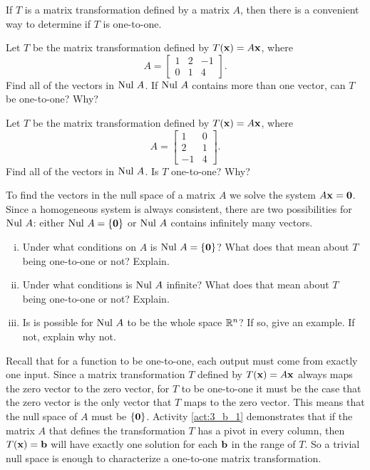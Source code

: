 \begin{activity} \label{act:3_b_1} 
If $T$ is a matrix transformation defined by a matrix $A$, then there is a convenient way to determine if $T$ is one-to-one.
\ba
\item Let $T$ be the matrix transformation defined by $T(\mathbf{x}) = A\mathbf{x}$, where 
\[A = \left[ \begin{array}{ccr} 1&2&-1 \\ 0&1&4 \end{array} \right].\]
Find all of the vectors in $\text{Nul } A$. If $\text{Nul } A$ contains more than one vector, can $T$ be one-to-one? Why?


\item Let $T$ be the matrix transformation defined by $T(\mathbf{x}) = A\mathbf{x}$, where 
\[A = \left[ \begin{array}{rc} 1&0 \\ 2&1 \\ -1&4 \end{array} \right].\]
Find all of the vectors in $\text{Nul } A$. Is $T$ one-to-one? Why?


\item To find the vectors in the null space of a matrix $A$ we solve the system $A \mathbf{x} = \mathbf{0}$. Since a homogeneous system is always consistent, there are two possibilities for $\text{Nul } A$: either $\text{Nul } A = \{\mathbf{0}\}$ or $\text{Nul } A$ contains infinitely many vectors. 
	\begin{enumerate}[i.]
	\item Under what conditions on $A$ is $\text{Nul } A = \{\mathbf{0}\}$? What does that mean about $T$ being one-to-one or not? Explain. 

	\item Under what conditions is $\text{Nul } A$ infinite? What does that mean about $T$ being one-to-one or not? Explain.

\item Is is possible for $\text{Nul } A$ to be the whole space $\mathbb{R}^n$? If so, give an example. If not, explain why not.

\end{enumerate}

\ea
\end{activity}


Recall that for a function to be  one-to-one, each output must come from exactly one input. Since a matrix transformation $T$ defined by $T(\mathbf{x}) = A \mathbf{x}$ always maps the zero vector to the zero vector, for $T$ to be one-to-one it must be the case that the zero vector is the only vector that $T$ maps to the zero vector. This means that the null space of $A$ must be $\{\mathbf{0}\}$. Activity \ref{act:3_b_1} demonstrates that if the matrix $A$ that defines the transformation $T$ has a pivot in every column, then $T(\mathbf{x}) = \mathbf{b}$ will have exactly one solution for each $\mathbf{b}$ in the range of $T$. So a trivial null space is enough to characterize a one-to-one matrix transformation.  


